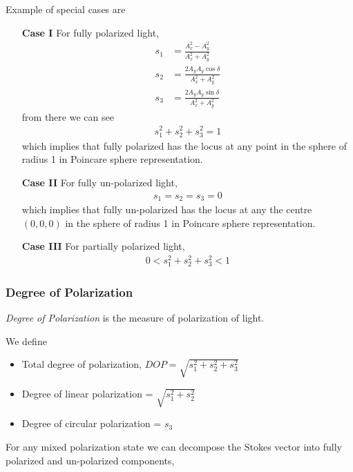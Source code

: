 \documentclass[11pt,a4paper]{article}
\numberwithin{equation}{section}
\begin{document}
Example of special cases are
\begin{enumerate}
	\item[\textbf{Case I}] For fully polarized light,
	\begin{align}
		s_1&=\frac{A_x^2 - A_y^2}{A_x^2 + A_y^2}\\
		s_2&=\frac{2A_yA_y\cos\delta}{A_x^2 + A_y^2}\\
		s_3&=\frac{2A_yA_y\sin\delta}{A_x^2 + A_y^2}
	\end{align}
from there we can see
\begin{align}
	s_1^2+s_2^2+s_3^2=1 \label{eq:1.29}
\end{align}
which implies that fully polarized has the locus at any point in the sphere of radius 1 in Poincare sphere representation.

\item[\textbf{Case II}] For fully un-polarized light,
\begin{align}
	s_1=s_2=s_3=0
\end{align}
which implies that fully un-polarized has the locus at any the centre $(0,0,0)$ in the sphere of radius 1 in Poincare sphere representation.

\item[\textbf{Case III}] For partially polarized light,
\begin{align}
	0<s_1^2+s_2^2+s_3^2<1
\end{align}
\end{enumerate}

\subsubsection{Degree of Polarization}
\textit{Degree of Polarization} is the measure of polarization of light.

We define
\begin{itemize}
	\item Total degree of polarization, $DOP = \sqrt{s_1^2+s_2^2+s_3^2}$
	\item Degree of linear polarization = $\sqrt{s_1^2+s_2^2}$
	\item Degree of circular polarization = $s_3$
\end{itemize}

For any mixed polarization state we can decompose the Stokes vector into fully polarized and un-polarized components,
\end{document}
